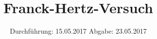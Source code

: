 

\subject{V601}
\title{Franck-Hertz-Versuch}
\date{
\centering
  Durchführung: 15.05.2017
  \hspace{3em}
  Abgabe: 23.05.2017
}



\maketitle
\thispagestyle{empty}
\tableofcontents
\newpage



%




\printbibliography


